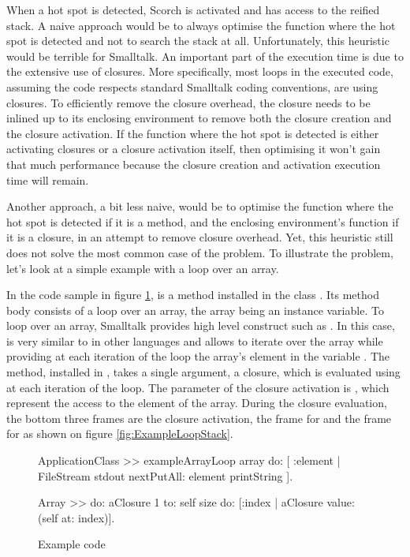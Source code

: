 \documentclass[a4paper,12pt,twoside]{../includes/ThesisStyle}
\begin{document}
When a hot spot is detected, Scorch is activated and has access to the reified stack. A naive approach would be to always optimise the function where the hot spot is detected and not to search the stack at all. Unfortunately, this heuristic would be terrible for Smalltalk. An important part of the execution time is due to the extensive use of closures. More specifically, most loops in the executed code, assuming the code respects standard Smalltalk coding conventions, are using closures. To efficiently remove the closure overhead, the closure needs to be inlined up to its enclosing environment to remove both the closure creation and the closure activation. If the function where the hot spot is detected is either activating closures or a closure activation itself, then optimising it won't gain that much performance because the closure creation and activation execution time will remain.

Another approach, a bit less naive, would be to optimise the function where the hot spot is detected if it is a method, and the enclosing environment's function if it is a closure, in an attempt to remove closure overhead. Yet, this heuristic still does not solve the most common case of the problem. To illustrate the problem, let's look at a simple example with a loop over an array.

In the code sample in figure \ref{fig:ExampleCode},  is a method installed in the class . Its method body consists of a loop over an array, the array being an instance variable. To loop over an array, Smalltalk provides high level construct such as . In this case,  is very similar to  in other languages and allows to iterate over the array while providing at each iteration of the loop the array's element in the variable . The  method, installed in , takes a single argument, a closure, which is evaluated using  at each iteration of the loop. The parameter of the closure activation is , which represent the access to the element  of the array. During the closure evaluation, the bottom three frames are the closure activation, the frame for  and the frame for  as shown on figure \ref{fig:ExampleLoopStack}.

\begin{figure}[h!]
    \begin{center}
        \begin{code}
        	ApplicationClass >> exampleArrayLoop
        	    array do: [ :element | FileStream stdout nextPutAll: element printString ].
        		
        	Array >> do: aClosure
        	    1 to: self size do: [:index | aClosure value: (self at: index)].
        \end{code}   
	\caption{Example code}
        \label{fig:ExampleCode}
    \end{center}
\end{figure}
\end{document}
